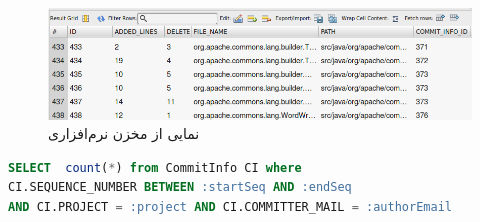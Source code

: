 \begin{figure}[H]
	\centering
	\includegraphics[width=1\textwidth]{img/case_study/change-file-info.png}
	\caption{نمایی از مخزن نرم‌افزاری}
	\label{fig:change-file-info}
\end{figure}

\begin{latin}
\begin{lstlisting}[language=SQL]
SELECT  count(*) from CommitInfo CI where 
CI.SEQUENCE_NUMBER BETWEEN :startSeq AND :endSeq 
AND CI.PROJECT = :project AND CI.COMMITTER_MAIL = :authorEmail

\end{lstlisting}
\end{latin}
